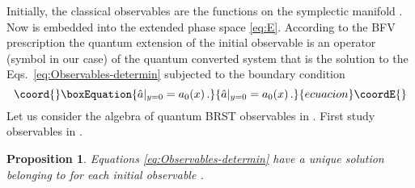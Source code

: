\documentclass[a4paper,11pt,oneside]{amsart}
\theoremstyle{plain}
\numberwithin{equation}{section} %
\numberwithin{figure}{section} %
\newtheorem{fact}{Proposition}[section]
\def\manM{{\mathcal M}}
\def\aA{{ \mathfrak A}}
\def\E{{ \mathcal E}}
\begin{document}
\noindent
Initially, the classical observables are the functions
on the symplectic manifold \myHighlight{$\manM$}\coordHE{}.  Now \myHighlight{$\manM$}\coordHE{} is embedded
into the extended phase space \myHighlight{$\E$}\coordHE{} \eqref{eq:E}.  According to the
BFV prescription the quantum extension of the
initial observable \coordHE{} is an operator (symbol in our case)
\coordHE{} of the quantum converted system that is the solution
to the Eqs.~\eqref{eq:Observables-determin}
subjected to the boundary condition
\begin{equation}\coord{}\boxEquation{
\label{eq:bc}
{\hat a}|_{y=0}=a_0(x)\,.
}{
{\hat a}|_{y=0}=a_0(x)\,.
}{ecuacion}\coordE{}\end{equation}
Let us consider the algebra of quantum BRST observables in
\myHighlight{$\aA^q$}\coordHE{}. First study observables in \myHighlight{$\aA^q_0 \subset \aA^q$}\coordHE{}.
\begin{fact}
\label{fact:observ-existence}
Equations \eqref{eq:Observables-determin} have a unique solution
belonging to \myHighlight{$\aA_0^q$}\coordHE{} for each initial observable \coordHE{}.
\end{fact}
\end{document}
